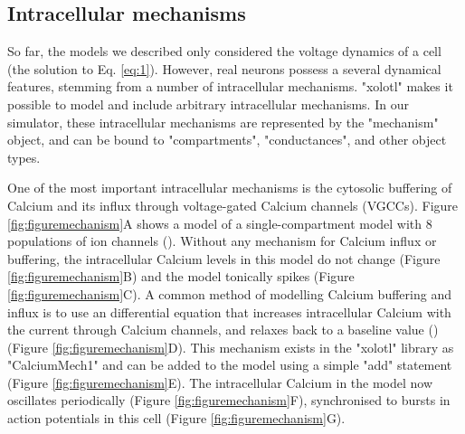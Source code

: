 \documentclass{frontiersSCNS} %
\begin{document}
\subsection{Intracellular mechanisms}

So far, the models we described only considered the voltage dynamics of a cell (the solution to Eq. \ref{eq:1}). However, real neurons possess a several dynamical features, stemming from a number of intracellular mechanisms. "xolotl" makes it possible to model and include arbitrary intracellular mechanisms. In our simulator, these intracellular mechanisms are represented by the "mechanism" object, and can be bound to "compartments", "conductances", and other object types. 

One of the most important intracellular mechanisms is the cytosolic buffering of Calcium and its influx through voltage-gated Calcium channels (VGCCs). Figure \ref{fig:figuremechanism}A shows a model of a single-compartment model with 8 populations of ion channels (\cite{liuModelNeuronActivityDependent1998}). Without any mechanism for Calcium influx or buffering, the intracellular Calcium levels in this model do not change (Figure \ref{fig:figuremechanism}B) and the model tonically spikes (Figure \ref{fig:figuremechanism}C). A common method of modelling Calcium buffering and influx is to use an differential equation that increases intracellular Calcium with the current through Calcium channels, and relaxes back to a baseline value (\cite{liuModelNeuronActivityDependent1998, prinzAlternativeHandtuningConductancebased2003, dayanTheoreticalNeuroscience2001}) (Figure \ref{fig:figuremechanism}D). This mechanism exists in the "xolotl" library as "CalciumMech1" and can be added to the model using a simple "add" statement (Figure \ref{fig:figuremechanism}E). The intracellular Calcium in the model now oscillates periodically (Figure \ref{fig:figuremechanism}F), synchronised to bursts in action potentials in this cell (Figure \ref{fig:figuremechanism}G).
\end{document}
